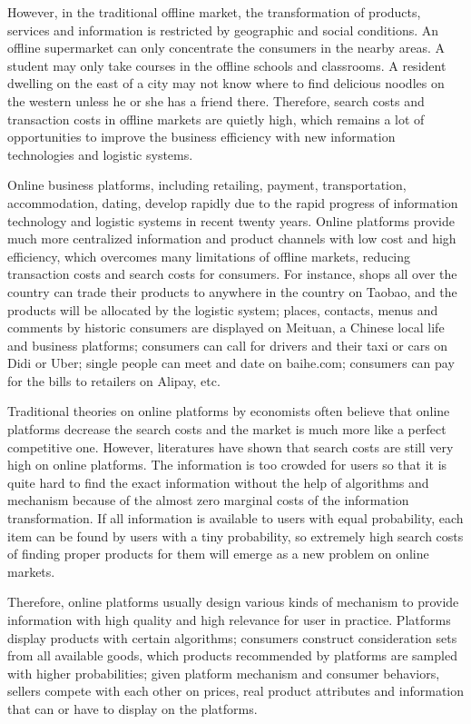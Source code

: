\documentclass{article}
\begin{document}
However, in the traditional offline market, the transformation of products, services and information is restricted by geographic and social conditions. An offline supermarket can only concentrate the consumers in the nearby areas. A student may only take courses in the offline schools and classrooms. A resident dwelling on the east of a city may not know where to find delicious noodles on the western unless he or she has a friend there. Therefore, search costs and transaction costs in offline markets are quietly high, which remains a lot of opportunities to improve the business efficiency with new information technologies and logistic systems. 

Online business platforms, including retailing, payment, transportation, accommodation, dating, develop rapidly due to the rapid progress of information technology and logistic systems in recent twenty years. Online platforms provide much more centralized information and product channels with low cost and high efficiency, which overcomes many limitations of offline markets, reducing transaction costs and search costs for consumers. For instance, shops all over the country can trade their products to anywhere in the country on Taobao, and the products will be allocated by the logistic system; places, contacts, menus and comments by historic consumers are displayed on Meituan, a Chinese local life and business platforms; consumers can call for drivers and their taxi or cars on Didi or Uber; single people can meet and date on baihe.com; consumers can pay for the bills to retailers on Alipay, etc. 
 
Traditional theories on online platforms by economists often believe that online platforms decrease the search costs and the market is much more like a perfect competitive one. However, literatures have shown that search costs are still very high on online platforms. The information is too crowded for users so that it is quite hard to find the exact information without the help of algorithms and mechanism because of the almost zero marginal costs of the information transformation. If all information is available to users with equal probability, each item can be found by users with a tiny probability, so extremely high search costs of finding proper products for them will emerge as a new problem on online markets. 

Therefore, online platforms usually design various kinds of mechanism to provide information with high quality and high relevance for user in practice. Platforms display products with certain algorithms; consumers construct consideration sets from all available goods, which products recommended by platforms are sampled with higher probabilities; given platform mechanism and consumer behaviors, sellers compete with each other on prices, real product attributes and information that can or have to display on the platforms. 
\end{document}
